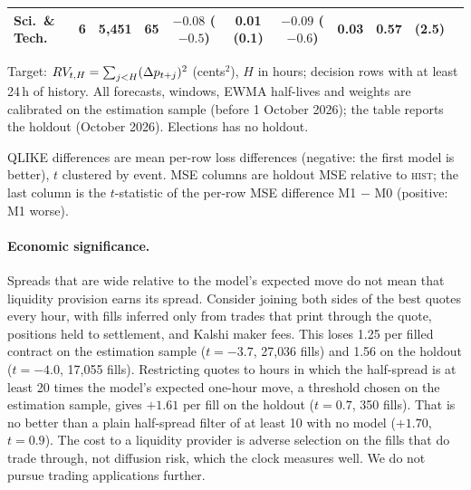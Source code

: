 \begin{table}[t]
\begin{threeparttable}
\begin{tabular}{lcrrccccccc}
Sci.\ \& Tech. & 6 & 5{,}451 & 65 & $-0.08$ ($-0.5$) & 0.01 (0.1) & $-0.09$ ($-0.6$) & 0.03 & 0.57 & (2.5) \\
\bottomrule
\end{tabular}
\begin{tablenotes}[flushleft]\footnotesize
\item Target: $RV_{t,H}=\sum_{j<H}(\Delta p_{t+j})^2$ (cents$^2$), $H$ in hours; decision rows with at least 24\,h of history. All forecasts, windows, EWMA half-lives and weights are calibrated on the estimation sample (before 1 October 2026); the table reports the holdout (October 2026). Elections has no holdout.
\item QLIKE differences are mean per-row loss differences (negative: the first model is better), $t$ clustered by event. MSE columns are holdout MSE relative to \textsc{hist}; the last column is the $t$-statistic of the per-row MSE difference M1 $-$ M0 (positive: M1 worse).
\end{tablenotes}
\end{threeparttable}
\end{table}

\paragraph{Economic significance.}
Spreads that are wide relative to the model's expected move do not mean that liquidity provision
earns its spread. Consider joining both sides of the best quotes every hour, with fills inferred
only from trades that print through the quote, positions held to settlement, and Kalshi maker fees.
This loses 1.25\cents{} per filled contract on the estimation sample ($t=-3.7$, 27{,}036 fills) and
1.56\cents{} on the holdout ($t=-4.0$, 17{,}055 fills). Restricting quotes to hours in which the
half-spread is at least 20 times the model's expected one-hour move, a threshold chosen on the
estimation sample, gives $+1.61$\cents{} per fill on the holdout ($t=0.7$, 350 fills). That is no
better than a plain half-spread filter of at least 10\cents{} with no model ($+1.70$\cents, $t=0.9$).
The cost to a liquidity provider is adverse selection on the fills that do trade through, not
diffusion risk, which the clock measures well. We do not pursue trading applications further.

